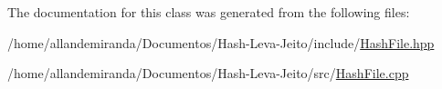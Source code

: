 The documentation for this class was generated from the following files\+:\begin{DoxyCompactItemize}
\item 
/home/allandemiranda/\+Documentos/\+Hash-\/\+Leva-\/\+Jeito/include/\hyperlink{_hash_file_8hpp}{Hash\+File.\+hpp}\item 
/home/allandemiranda/\+Documentos/\+Hash-\/\+Leva-\/\+Jeito/src/\hyperlink{_hash_file_8cpp}{Hash\+File.\+cpp}\end{DoxyCompactItemize}
